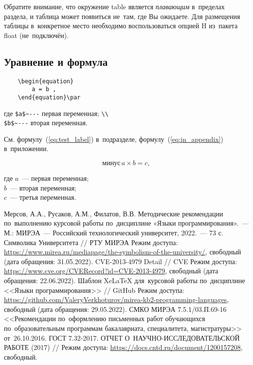 \documentclass{mirea-prog-lang}
\begin{document}
Обратите внимание, что окружение table является \emph{плавающим} в~пределах раздела, и таблица может появиться не~там, где Вы ожидаете. Для размещения таблицы в~конкретное место необходимо воспользоваться опцией H из~пакета float (не~подключён).

\subsection{Уравнение и формула}

\begin{verbatim}
	\begin{equation}
		a = b ,
	\end{equation}\par
\end{verbatim}\vspace{-.5cm}
{где \verb"$a$~---" первая переменная; \verb"\\" \\
	\verb"$b$~---" вторая переменная.}\bigskip

См. формулу~(\ref{eq:test_label}) в~подразделе, формулу~(\ref{eq:in_appendix}) в~приложении.

\begin{equation}\label{eq:test_label}
	\text{минус}\,a\times b=c ,
\end{equation}

где $a$~--- первая переменная; \\
$b$~--- вторая переменная; \\
$c$~--- третья переменная.



\begin{thebibliography}{99\kern\bibindent}
	 Мерсов, А.А., Русаков, А.М., Филатов, В.В. Методические рекомендации по~выполнению курсовой работы по~дисциплине «Языки программирования».~--- М.: МИРЭА~--- Российский технологический университет, 2022.~--- 73 с.
	 Символика Университета // РТУ МИРЭА Режим доступа: \url{https://www.mirea.ru/mediapage/the-symbolism-of-the-university/}, свободный (дата обращения: 31.05.2022).
	 CVE-2013-4979 Detail // CVE Режим доступа: \url{https://www.cve.org/CVERecord?id=CVE-2013-4979}, свободный (дата обращения: 22.06.2022).
	 Шаблон XeLaTeX для~курсовой работы по~дисциплине <<Языки программирования>> // GitHub Режим доступа: \url{https://github.com/ValeryVerkhoturov/mirea-kb2-programming-languages}, свободный (дата обращения: 29.05.2022).
	 СМКО МИРЭА 7.5.1/03.П.69-16 <<Рекомендации по~оформлению письменных работ обучающихся по~образовательным программам бакалавриата, специалитета, магистратуры>> от~26.10.2016.
	 ГОСТ 7.32-2017. ОТЧЕТ О~НАУЧНО-ИССЛЕДОВАТЕЛЬСКОЙ РАБОТЕ (2017) // Режим доступа: \url{https://docs.cntd.ru/document/1200157208}, свободный.
\end{thebibliography}
\end{document}
